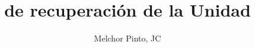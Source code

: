 \documentclass[examen]{RDS_unit}
\title{de recuperación de la Unidad}
\author{Melchor Pinto, JC}
\begin{document}
\begin{questions}
	
\end{questions}
\end{document}
